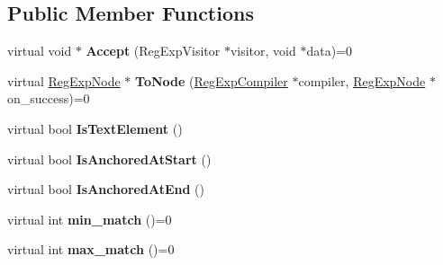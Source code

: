 \subsection*{Public Member Functions}
\begin{DoxyCompactItemize}
\item 
virtual void $\ast$ {\bfseries Accept} (Reg\+Exp\+Visitor $\ast$visitor, void $\ast$data)=0\hypertarget{classv8_1_1internal_1_1_reg_exp_tree_a47b10904011eb76bb081c2354c5d0232}{}\label{classv8_1_1internal_1_1_reg_exp_tree_a47b10904011eb76bb081c2354c5d0232}

\item 
virtual \hyperlink{classv8_1_1internal_1_1_reg_exp_node}{Reg\+Exp\+Node} $\ast$ {\bfseries To\+Node} (\hyperlink{classv8_1_1internal_1_1_reg_exp_compiler}{Reg\+Exp\+Compiler} $\ast$compiler, \hyperlink{classv8_1_1internal_1_1_reg_exp_node}{Reg\+Exp\+Node} $\ast$on\+\_\+success)=0\hypertarget{classv8_1_1internal_1_1_reg_exp_tree_a9670a35c2a033db8032ca275910e1ac2}{}\label{classv8_1_1internal_1_1_reg_exp_tree_a9670a35c2a033db8032ca275910e1ac2}

\item 
virtual bool {\bfseries Is\+Text\+Element} ()\hypertarget{classv8_1_1internal_1_1_reg_exp_tree_ad942297d0d8695a8401e3841d9ad5b8c}{}\label{classv8_1_1internal_1_1_reg_exp_tree_ad942297d0d8695a8401e3841d9ad5b8c}

\item 
virtual bool {\bfseries Is\+Anchored\+At\+Start} ()\hypertarget{classv8_1_1internal_1_1_reg_exp_tree_a63684350c648009df5ee42068a39a4fc}{}\label{classv8_1_1internal_1_1_reg_exp_tree_a63684350c648009df5ee42068a39a4fc}

\item 
virtual bool {\bfseries Is\+Anchored\+At\+End} ()\hypertarget{classv8_1_1internal_1_1_reg_exp_tree_a6a53cc0f2787e7cd698f5c44886f9816}{}\label{classv8_1_1internal_1_1_reg_exp_tree_a6a53cc0f2787e7cd698f5c44886f9816}

\item 
virtual int {\bfseries min\+\_\+match} ()=0\hypertarget{classv8_1_1internal_1_1_reg_exp_tree_a6aee84bbe2e078446f84681b70ebc32a}{}\label{classv8_1_1internal_1_1_reg_exp_tree_a6aee84bbe2e078446f84681b70ebc32a}

\item 
virtual int {\bfseries max\+\_\+match} ()=0\hypertarget{classv8_1_1internal_1_1_reg_exp_tree_ad27450dae179517a30b47de7eedde3c4}{}\label{classv8_1_1internal_1_1_reg_exp_tree_ad27450dae179517a30b47de7eedde3c4}


\end{DoxyCompactItemize}
